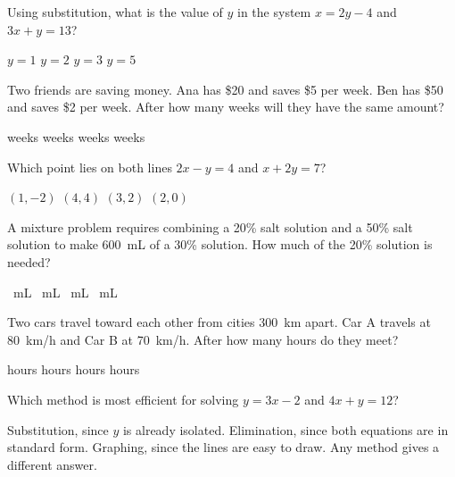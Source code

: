 \documentclass[addpoints]{exam}
\begin{document}
\begin{questions}
\question[1] Using substitution, what is the value of $y$ in the system $x = 2y - 4$ and $3x + y = 13$?
\begin{choices}
    \choice $y = 1$
    \choice $y = 2$
    \correctchoice $y = 3$
    \choice $y = 5$
\end{choices}
\vspace{3mm}

\question[1] Two friends are saving money. Ana has \$20 and saves \$5 per week. Ben has \$50 and saves \$2 per week. After how many weeks will they have the same amount?
\begin{choices}
     weeks
     weeks
     weeks
     weeks
\end{choices}
\vspace{3mm}

\question[1] Which point lies on both lines $2x - y = 4$ and $x + 2y = 7$?
\begin{choices}
    \choice $(1, -2)$
    \choice $(4, 4)$
    \correctchoice $(3, 2)$
    \choice $(2, 0)$
\end{choices}
\vspace{3mm}

\question[1] A mixture problem requires combining a 20\% salt solution and a 50\% salt solution to make 600~mL of a 30\% solution. How much of the 20\% solution is needed?
\begin{choices}
    ~mL
    ~mL
    ~mL
    ~mL
\end{choices}
\vspace{3mm}

\question[1] Two cars travel toward each other from cities 300~km apart. Car A travels at 80~km/h and Car B at 70~km/h. After how many hours do they meet?
\begin{choices}
     hours
     hours
     hours
     hours
\end{choices}
\vspace{3mm}

\question[1] Which method is most efficient for solving $y = 3x - 2$ and $4x + y = 12$?
\begin{choices}
    \correctchoice Substitution, since $y$ is already isolated.
    \choice Elimination, since both equations are in standard form.
    \choice Graphing, since the lines are easy to draw.
    \choice Any method gives a different answer.
\end{choices}
\vspace{3mm}


\end{questions}
\end{document}
